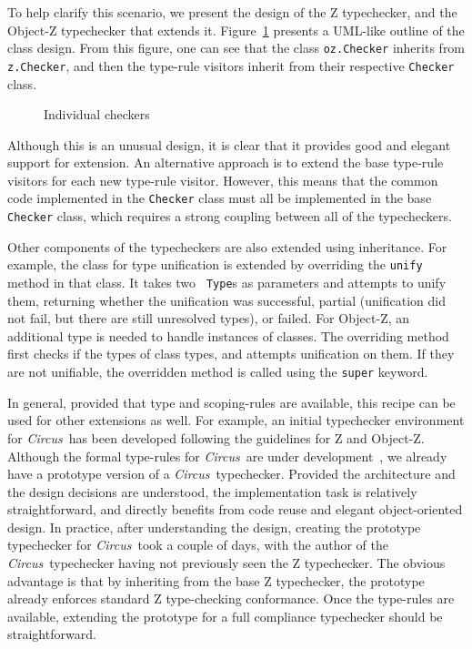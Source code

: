 \documentclass{llncs}
\newcommand{\Circus}{{\sf\slshape Circus}}
\begin{document}
To help clarify this scenario, we present the design of the Z
typechecker, and the Object-Z typechecker that extends
it. Figure~\ref{tc-design} presents a UML-like outline of the class
design. From this figure, one can see that the class {\tt oz.Checker}
inherits from {\tt z.Checker}, and then the type-rule visitors inherit
from their respective {\tt Checker} class.
%
\def\epsfsize#1#2{0.70#1}
\begin{figure}[t]
\begin{center}
\caption{Individual checkers}\label{tc-design}
\end{center}
\end{figure}
\def\epsfsize#1#2{\epsfxsize}
%
Although this is an unusual design, it is clear that it provides good and elegant support for extension.
An alternative approach is to extend the base type-rule visitors for each new type-rule visitor.
However, this means that the common code implemented in the {\tt Checker} class must all be
implemented in the base {\tt Checker} class, which requires a strong coupling between
all of the typecheckers.

Other components of the typecheckers are also extended using
inheritance.  For example, the class for type unification is extended
by overriding the {\tt unify} method in that class.  It takes two {\tt
Type}s as parameters and attempts to unify them, returning whether the
unification was successful, partial (unification did not fail, but
there are still unresolved types), or failed.  For Object-Z, an
additional type is needed to handle instances of classes.  The
overriding method first checks if the types of class types, and
attempts unification on them.  If they are not unifiable, the
overridden method is called using the {\tt super} keyword.

In general, provided that type and scoping-rules are available, this
recipe can be used for other extensions as well.  For example, an
initial typechecker environment for \Circus\ has been developed
following the guidelines for Z and Object-Z. Although the formal
type-rules for \Circus\ are under
development~\cite{circus.other:typechecker}, we already have a
prototype version of a \Circus\ typechecker.  Provided the
architecture and the design decisions are understood, the
implementation task is relatively straightforward, and directly
benefits from code reuse and elegant object-oriented design.  In
practice, after understanding the design, creating the prototype
typechecker for \Circus\ took a couple of days, with the author of the
\Circus\ typechecker having not previously seen the Z
typechecker. The obvious advantage is that by inheriting from the
base Z typechecker, the prototype already enforces standard Z
type-checking conformance. Once the type-rules are available,
extending the prototype for a full compliance typechecker should be
straightforward.
\end{document}
